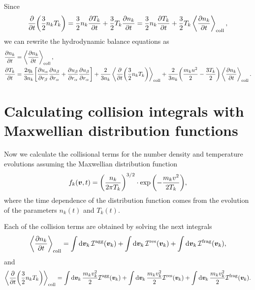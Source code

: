 \documentclass[aps,prl,preprint,groupedaddress,10pt]{revtex4-2}
\begin{document}
Since
\begin{equation}
    \pdv{t}\pqty{\frac{3}{2}n_kT_k}=\frac{3}{2}n_k\pdv{T_k}{t}+
    \frac{3}{2}T_k\pdv{n_k}{t}=\frac{3}{2}n_k\pdv{T_k}{t}+
    \frac{3}{2}T_k\ltx{\avg{\pdv{n_k}{t}}}{coll},
\end{equation}
we can rewrite the hydrodynamic balance equations as 
\begin{equation}
    \begin{split}
        \pdv{n_k}{t} &= \ltx{\avg{\pdv{n_k}{t}}}{coll},\\
        \pdv{T_k}{t} &=
        \frac{2\eta_k}{3n_k}\bqty{\pdv{\ia{u}}{\ib{r}}\pdv{\ib{u}}{\ia{r}}+
        \pdv{\ib{u}}{\ia{r}}\pdv{\ib{u}}{\ia{r}}}+
        \frac{2}{3n_k}\ltx{\avg{\pdv{t}\pqty{\frac{3}{2}n_kT_k}}}{coll}+
        \frac{2}{3n_k}\pqty{\frac{m_ku^2}{2}-\frac{3T_k}{2}}\ltx{\avg{\pdv{n_k}{t}}}{coll}.
    \end{split}
\end{equation}

\section{Calculating collision integrals with Maxwellian distribution functions}
Now we calculate the collisional terms for the number density and temperature 
evolutions assuming the Maxwellian distribution function
\begin{equation}
    f_k\pqty{\bv,t}=\pqty{\frac{n_k}{2\pi T_k}}^{3/2}\cdot
    \exp\pqty{-\frac{m_kv^2}{2T_k}},
\end{equation}
where the time dependence of the distribution function comes from the evolution
of the parameters $n_k(t)$ and $T_k(t)$.

Each of the collision terms are obtained by solving the next integrals
\begin{equation}
    \left\langle{\pdv{n_k}{t}}\right\rangle_{\mathrm{coll}} = \int\dd{\vb*{v}_k}\mathcal{I}^{\mathrm{agg}}(\vb*{v}_k)+
    \int\dd{\vb*{v}_k}\mathcal{I}^{\mathrm{res}}(\vb*{v}_k)+
    \int\dd{\vb*{v}_k}\mathcal{I}^{\mathrm{frag}}(\vb*{v}_k),
\end{equation}
and
\begin{equation}
    \ltx{\avg{\pdv{t}\pqty{\frac{3}{2}n_kT_k}}}{coll} = 
    \int\dd{\bv_k}\frac{m_kv_k^2}{2}\utx{\mathcal{I}}{agg}(\bv_k)+
    \int\dd{\bv_k}\frac{m_kv_k^2}{2}\utx{\mathcal{I}}{res}(\bv_k)+
    \int\dd{\bv_k}\frac{m_kv_k^2}{2}\utx{\mathcal{I}}{frag}(\bv_k).
\end{equation}
\end{document}
